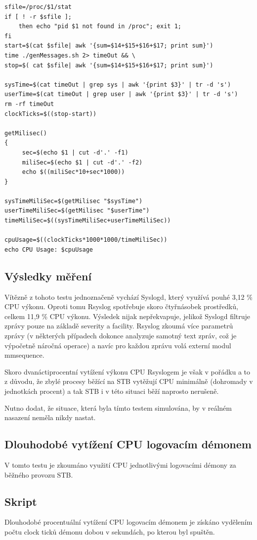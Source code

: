 \documentclass[thesis=B,czech]{FITthesis}[2012/06/26]
\begin{document}
\begin{lstlisting}[style=AshStyle]
sfile=/proc/$1/stat
if [ ! -r $sfile ];
	then echo "pid $1 not found in /proc"; exit 1;
fi
start=$(cat $sfile| awk '{sum=$14+$15+$16+$17; print sum}')
time ./genMessages.sh 2> timeOut && \
stop=$( cat $sfile| awk '{sum=$14+$15+$16+$17; print sum}')

sysTime=$(cat timeOut | grep sys | awk '{print $3}' | tr -d 's')
userTime=$(cat timeOut | grep user | awk '{print $3}' | tr -d 's')
rm -rf timeOut
clockTicks=$((stop-start))

getMilisec()
{
	 sec=$(echo $1 | cut -d'.' -f1)
	 miliSec=$(echo $1 | cut -d'.' -f2)
	 echo $((miliSec*10+sec*1000))
}

sysTimeMiliSec=$(getMilisec "$sysTime")
userTimeMiliSec=$(getMilisec "$userTime")
timeMiliSec=$((sysTimeMiliSec+userTimeMiliSec))

cpuUsage=$((clockTicks*1000*1000/timeMiliSec))
echo CPU Usage: $cpuUsage
\end{lstlisting}

\subsection*{Výsledky měření}
Vítězně z tohoto testu jednoznačeně vychází Syslogd, který využívá pouhé 3,12 \% CPU výkonu. Oproti tomu Rsyslog spotřebuje skoro čtyřnásobek prostředků, celkem 11,9 \% CPU výkonu.
Výsledek nijak nepřekvapuje, jelikož Syslogd filtruje zprávy pouze na základě severity a facility. Rsyslog zkoumá více parametrů zprávy (v některých případech dokonce analyzuje samotný text zpráv, což je výpočetně náročná operace) a navíc pro každou zprávu volá externí modul mmsequence.

Skoro dvanáctiprocentní vytížení výkonu CPU Rsyslogem je však v pořádku a to z důvodu, že zbylé procesy běžící na STB vytěžují CPU minimálně (dohromady v jednotkách  procent) a tak STB i v této situaci běží naprosto nerušeně.

Nutno dodat, že situace, která byla tímto testem simulována, by v reálném nasazení neměla nikdy nastat.

\subsection{Dlouhodobé vytížení CPU logovacím démonem}
V tomto testu je zkoumáno využití CPU jednotlivými logovacími démony za běžného provozu STB.

\subsection*{Skript}
Dlouhodobé procentuální vytížení CPU logovacím démonem je získáno vydělením počtu clock ticků démonu dobou v sekundách, po kterou byl spuštěn.
\end{document}
